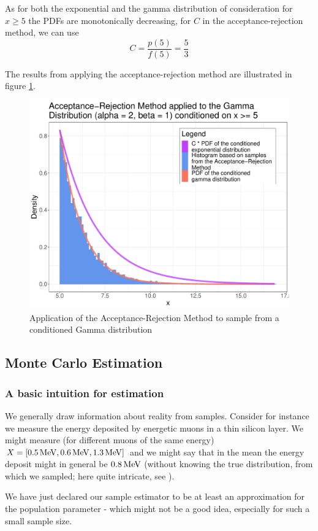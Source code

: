 As for both the exponential and the gamma distribution of consideration for $x\geq 5$ the PDFs are monotonically decreasing, for $C$ in the acceptance-rejection method, we can use
\begin{equation} {
    C = \frac{p(5)}{f(5)} = \frac{5}{3}
}
\end{equation}

The results from applying the acceptance-rejection method are illustrated in figure \ref{fig:gamma_conditional}.

\begin{figure}[!htb]
    \centering
    \includegraphics[width=1.0\textwidth]{figures/gamma_conditional.pdf}\hfill
    \caption{Application of the Acceptance-Rejection Method to sample from a conditioned Gamma distribution}
    \label{fig:gamma_conditional}
\end{figure}

\subsection{Monte Carlo Estimation}

\subsubsection{A basic intuition for estimation}
We generally draw information about reality from samples. Consider for instance we measure the energy deposited
by energetic muons in a thin silicon layer. We might measure (for different muons of the same energy) 
$X = [0.5 \operatorname{MeV}, 0.6 \operatorname{MeV}, 1.3 \operatorname{MeV}]$ and we might say that in the mean the energy deposit might in general be $0.8 \operatorname{MeV}$ (without
knowing the true distribution, from which we sampled; here quite intricate, see \cite[figure 34.7]{particle2020}).
\par
We have just declared our sample estimator to be at least an approximation for the population parameter - which
might not be a good idea, especially for such a small sample size.

